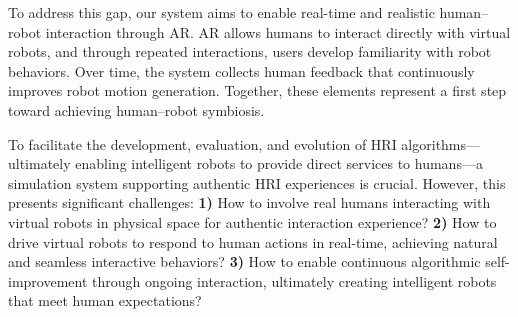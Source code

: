 
To address this gap, our system aims to enable real-time and realistic human–robot interaction through AR. AR allows humans to interact directly with virtual robots, and through repeated interactions, users develop familiarity with robot behaviors. Over time, the system collects human feedback that continuously improves robot motion generation. Together, these elements represent a first step toward achieving human–robot symbiosis.

To facilitate the development, evaluation, and evolution %
of HRI algorithms—ultimately enabling intelligent robots to provide direct services to humans—a simulation system supporting authentic HRI experiences is crucial. However, this presents significant challenges: 
\textbf{1)} How to involve real humans interacting with virtual robots in physical space for authentic interaction experience? \textbf{2)} How to drive virtual robots to respond to human actions in real-time, achieving natural and seamless interactive behaviors? \textbf{3)} How to enable continuous algorithmic self-improvement through ongoing interaction, ultimately creating intelligent robots that meet human expectations?

